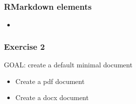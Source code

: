 \documentclass{beamer}
\begin{document}
\begin{frame}
    \frametitle{RMarkdown elements}
    \begin{itemize}
        \item 
    \end{itemize}
\end{frame}












\begin{frame}
    \frametitle{Exercise 2}
    {\sc GOAL: create a default minimal document}
    \begin{itemize}
        \item Create a pdf document
        \item Create a docx document
    \end{itemize}
\end{frame}
\end{document}
